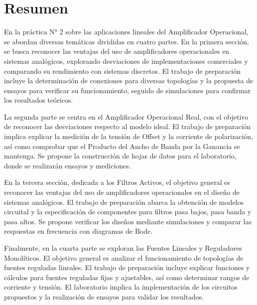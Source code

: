 
\section{Resumen}

En la práctica N° 2 sobre las aplicaciones lineales del Amplificador Operacional, se abordan diversas temáticas divididas en cuatro partes. En la primera sección, se busca reconocer las ventajas del uso de amplificadores operacionales en sistemas analógicos, explorando desviaciones de implementaciones comerciales y comparando su rendimiento con sistemas discretos. El trabajo de preparación incluye la determinación de conexiones para diversas topologías y la propuesta de ensayos para verificar su funcionamiento, seguido de simulaciones para confirmar los resultados teóricos.

La segunda parte se centra en el Amplificador Operacional Real, con el objetivo de reconocer las desviaciones respecto al modelo ideal. El trabajo de preparación implica explicar la medición de la tensión de Offset y la corriente de polarización, así como comprobar que el Producto del Ancho de Banda por la Ganancia se mantenga. Se propone la construcción de hojas de datos para el laboratorio, donde se realizarán ensayos y mediciones.

En la tercera sección, dedicada a los Filtros Activos, el objetivo general es reconocer las ventajas del uso de amplificadores operacionales en el diseño de sistemas analógicos. El trabajo de preparación abarca la obtención de modelos circuital y la especificación de componentes para filtros pasa bajos, pasa banda y pasa altos. Se propone verificar los diseños mediante simulaciones y comparar las respuestas en frecuencia con diagramas de Bode.

Finalmente, en la cuarta parte se exploran las Fuentes Lineales y Reguladores Monolíticos. El objetivo general es analizar el funcionamiento de topologías de fuentes reguladas lineales. El trabajo de preparación incluye explicar funciones y cálculos para fuentes reguladas fijas y ajustables, así como determinar rangos de corriente y tensión. El laboratorio implica la implementación de los circuitos propuestos y la realización de ensayos para validar los resultados. 
\newpage